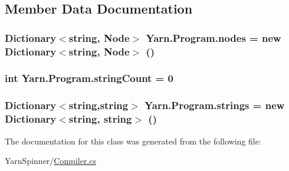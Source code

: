 \subsection{Member Data Documentation}
\hypertarget{a00067_a3f4928a577c88263ad016be259b175c4}{
\subsubsection[{nodes}]{\setlength{\rightskip}{0pt plus 5cm}Dictionary$<$string, {\bf Node}$>$ Yarn.\-Program.\-nodes = new Dictionary$<$string, {\bf Node}$>$ ()}}\label{a00067_a3f4928a577c88263ad016be259b175c4}
\hypertarget{a00067_a8ef1d10094ef00311aade6715ba78ec7}{
\subsubsection[{string\-Count}]{\setlength{\rightskip}{0pt plus 5cm}int Yarn.\-Program.\-string\-Count = 0\hspace{0.3cm}{\ttfamily [private]}}}\label{a00067_a8ef1d10094ef00311aade6715ba78ec7}
\hypertarget{a00067_a91518fda7e41bf573f66c6946dd3b4cb}{
\subsubsection[{strings}]{\setlength{\rightskip}{0pt plus 5cm}Dictionary$<$string,string$>$ Yarn.\-Program.\-strings = new Dictionary$<$string, string$>$ ()}}\label{a00067_a91518fda7e41bf573f66c6946dd3b4cb}


The documentation for this class was generated from the following file\-:\begin{DoxyCompactItemize}
\item 
Yarn\-Spinner/\hyperlink{a00116}{Compiler.\-cs}\end{DoxyCompactItemize}

